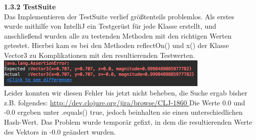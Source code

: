 \documentclass[]{article}
\begin{document}
\textbf{1.3.2 TestSuite}\\

Das Implementieren der TestSuite verlief größtenteils problemlos.
Als erstes wurde mithilfe von IntelliJ ein Testgerüst für jede Klasse erstellt, und anschließend wurden alle zu testenden Methoden mit den richtigen Werten getestet.
Hierbei kam es bei den Methoden reflectOn() und x() der Klasse Vector3 zu Komplikationen mit den resultierenden Testwerten.\\

\includegraphics[scale=1]{05.png}\\

Leider konnten wir diesen Fehler bis jetzt nicht beheben, die Suche ergab bisher z.B. folgendes: \url{http://dev.clojure.org/jira/browse/CLJ-1860 }
Die Werte 0.0 und -0.0 ergeben unter .equals() true, jedoch beinhalten sie einen unterschiedlichen Hash-Wert. 
Das Problem wurde temporär gefixt, in dem die resultierenden Werte des Vektors in -0.0 geändert wurden.
\end{document}
